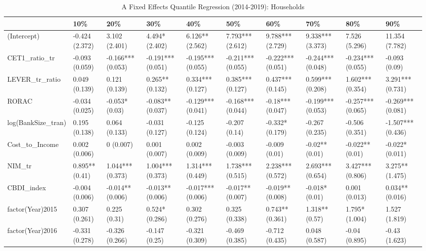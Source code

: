 \begin{table}[ht]
\centering
\caption{A Fixed Effects Quantile Regression (2014-2019): Households} 
\begingroup\small
\begin{tabular}{llllllllll}
  \toprule
 & 10\% & 20\% & 30\% & 40\% & 50\% & 60\% & 70\% & 80\% & 90\% \\ 
  \midrule
(Intercept) & -0.424 (2.372) & 3.102 (2.401) & 4.494* (2.402) & 6.126** (2.562) & 7.793*** (2.612) & 9.788*** (2.729) & 9.338*** (3.373) & 7.526 (5.296) & 11.354 (7.782) \\ 
  CET1\_ratio\_tr & -0.093 (0.059) & -0.166*** (0.053) & -0.191*** (0.051) & -0.195*** (0.055) & -0.211*** (0.055) & -0.222*** (0.051) & -0.244*** (0.048) & -0.234*** (0.055) & -0.093 (0.09) \\ 
  LEVER\_tr\_ratio & 0.049 (0.139) & 0.121 (0.139) & 0.265** (0.132) & 0.334*** (0.127) & 0.385*** (0.127) & 0.437*** (0.145) & 0.599*** (0.208) & 1.602*** (0.354) & 3.291*** (0.731) \\ 
  RORAC & -0.034 (0.025) & -0.053* (0.03) & -0.083** (0.037) & -0.129*** (0.041) & -0.168*** (0.044) & -0.18*** (0.047) & -0.199*** (0.053) & -0.257*** (0.065) & -0.269*** (0.081) \\ 
  log(BankSize\_tran) & 0.195 (0.138) & 0.064 (0.133) & -0.031 (0.127) & -0.125 (0.124) & -0.207 (0.14) & -0.332* (0.179) & -0.267 (0.235) & -0.506 (0.351) & -1.507*** (0.436) \\ 
  Cost\_to\_Income & 0.002 (0.006) & 0 (0.007) & 0.001 (0.007) & 0.002 (0.009) & -0.003 (0.009) & -0.009 (0.01) & -0.02** (0.01) & -0.022** (0.01) & -0.022* (0.011) \\ 
  NIM\_tr & 0.895** (0.41) & 1.044*** (0.373) & 1.004*** (0.373) & 1.314*** (0.449) & 1.738*** (0.515) & 2.238*** (0.572) & 2.693*** (0.654) & 3.427*** (0.806) & 3.275** (1.475) \\ 
  CBDI\_index & -0.004 (0.006) & -0.014** (0.006) & -0.013** (0.006) & -0.017*** (0.006) & -0.017** (0.007) & -0.019** (0.008) & -0.018* (0.01) & 0.001 (0.013) & 0.034** (0.016) \\ 
  factor(Year)2015 & 0.307 (0.261) & 0.225 (0.31) & 0.524* (0.286) & 0.302 (0.276) & 0.325 (0.338) & 0.743** (0.361) & 1.318** (0.57) & 1.795* (1.004) & 1.527 (1.819) \\ 
  factor(Year)2016 & -0.331 (0.278) & -0.326 (0.266) & -0.147 (0.25) & -0.321 (0.309) & -0.469 (0.385) & -0.712 (0.435) & 0.048 (0.587) & -0.04 (0.895) & -0.43 (1.623) \\ 

\end{tabular}
\end{table}
